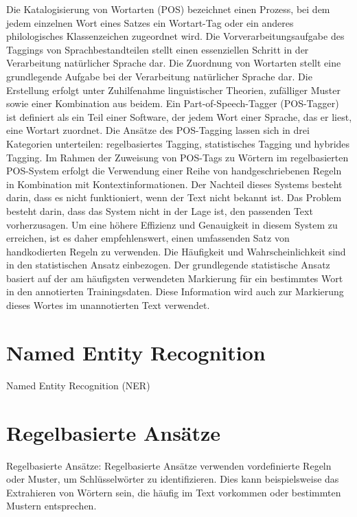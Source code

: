 Die Katalogisierung von Wortarten (POS) bezeichnet einen Prozess, bei dem jedem einzelnen Wort eines Satzes ein Wortart-Tag oder ein anderes philologisches Klassenzeichen zugeordnet wird. Die Vorverarbeitungsaufgabe des Taggings von Sprachbestandteilen stellt einen essenziellen Schritt in der Verarbeitung natürlicher Sprache dar. Die Zuordnung von Wortarten stellt eine grundlegende Aufgabe bei der Verarbeitung natürlicher Sprache dar. Die Erstellung erfolgt unter Zuhilfenahme linguistischer Theorien, zufälliger Muster sowie einer Kombination aus beidem. Ein Part-of-Speech-Tagger (POS-Tagger) ist definiert als ein Teil einer Software, der jedem Wort einer Sprache, das er liest, eine Wortart zuordnet. Die Ansätze des POS-Tagging lassen sich in drei Kategorien unterteilen: regelbasiertes Tagging, statistisches Tagging und hybrides Tagging. Im Rahmen der Zuweisung von POS-Tags zu Wörtern im regelbasierten POS-System erfolgt die Verwendung einer Reihe von handgeschriebenen Regeln in Kombination mit Kontextinformationen. Der Nachteil dieses Systems besteht darin, dass es nicht funktioniert, wenn der Text nicht bekannt ist. Das Problem besteht darin, dass das System nicht in der Lage ist, den passenden Text vorherzusagen. Um eine höhere Effizienz und Genauigkeit in diesem System zu erreichen, ist es daher empfehlenswert, einen umfassenden Satz von handkodierten Regeln zu verwenden. Die Häufigkeit und Wahrscheinlichkeit sind in den statistischen Ansatz einbezogen. Der grundlegende statistische Ansatz basiert auf der am häufigsten verwendeten Markierung für ein bestimmtes Wort in den annotierten Trainingsdaten. Diese Information wird auch zur Markierung dieses Wortes im unannotierten Text verwendet.\cite{kumawat2015pos}

\section{Named Entity Recognition}
Named Entity Recognition (NER) \cite{mansouri2008named} \cite{nadeau2007survey}\cite{partalidou2019design}\\

\section{Regelbasierte Ansätze}
Regelbasierte Ansätze: Regelbasierte Ansätze verwenden vordefinierte Regeln oder Muster, um Schlüsselwörter zu identifizieren. Dies kann beispielsweise das Extrahieren von Wörtern sein, die häufig im Text vorkommen oder bestimmten Mustern entsprechen.\\

